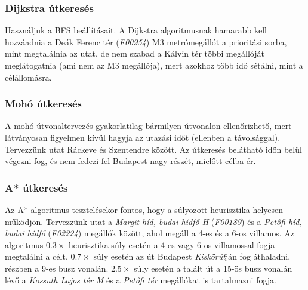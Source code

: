 \subsubsection{Dijkstra útkeresés}

Használjuk a BFS beállításait. A Dijkstra algoritmusnak hamarabb kell hozzáadnia a Deák Ferenc tér (\textit{F00954}) M3 metrómegállót a prioritási sorba, mint megtalálnia az utat, de nem szabad a Kálvin tér többi megállóját meglátogatnia (ami nem az M3 megállója), mert azokhoz több idő sétálni, mint a célállomásra.

\subsubsection{Mohó útkeresés}

A mohó útvonaltervezés gyakorlatilag bármilyen útvonalon ellenőrizhető, mert látványosan figyelmen kívül hagyja az utazási időt (ellenben a távolsággal). Tervezzünk utat Ráckeve és Szentendre között. Az útkeresés belátható időn belül végezni fog, és nem fedezi fel Budapest nagy részét, mielőtt célba ér.

\subsubsection{A* útkeresés}

Az A* algoritmus tesztelésekor fontos, hogy a súlyozott heurisztika helyesen működjön. Tervezzünk utat a \textit{Margit híd, budai hídfő H} (\textit{F00189}) és a \textit{Petőfi híd, budai hídfő} (\textit{F02224}) megállók között, ahol megáll a 4-es és a 6-os villamos. Az algoritmus $0.3\times$ heurisztika súly esetén a 4-es vagy 6-os villamossal fogja megtalálni a célt. $0.7\times$ súly esetén az út Budapest \textit{Kiskörút}ján fog áthaladni, részben a 9-es busz vonalán. $2.5\times$ súly esetén a talált út a 15-ös busz vonalán lévő a \textit{Kossuth Lajos tér M} és a \textit{Petőfi tér} megállókat is tartalmazni fogja.
